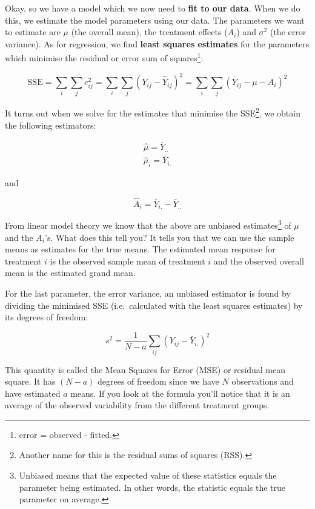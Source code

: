 \documentclass[
  letterpaper,
]{book}
\begin{document}
Okay, so we have a model which we now need to \textbf{fit to our data}.
When we do this, we estimate the model parameters using our data. The
parameters we want to estimate are \(\mu\) (the overall mean), the
treatment effects (\(A_i\)) and \(\sigma^2\) (the error variance). As
for regression, we find \textbf{least squares estimates} for the
parameters which minimise the residual or error sum of
squares\footnote{error = observed - fitted.}:

\[ \text{SSE} = \sum_i\sum_j e_{ij}^2 = \sum_i\sum_j (Y_{ij} - \hat{Y}_{ij})^2 = \sum_i\sum_j (Y_{ij} - \mu - A_i)^2\]

It turns out when we solve for the estimates that minimise the
SSE\footnote{Another name for this is the residual sums of squares
  (RSS).}, we obtain the following estimators:

\[
\begin{aligned}
\hat{\mu} = \bar{Y}_{..} \\
\hat{\mu}_i = \bar{Y}_{i.}
\end{aligned}
\]

and

\[\hat{A}_i =  \bar{Y}_{i.} - \bar{Y}_{..}\]

From linear model theory we know that the above are unbiased
estimates\footnote{Unbiased means that the expected value of these
  statistics equals the parameter being estimated. In other words, the
  statistic equals the true parameter on average.} of \(\mu\) and the
\(A_i\)'s. What does this tell you? It tells you that we can use the
sample means as estimates for the true means. The estimated mean
response for treatment \(i\) is the observed sample mean of treatment
\(i\) and the observed overall mean is the estimated grand mean.

For the last parameter, the error variance, an unbiased estimator is
found by dividing the minimised SSE (i.e.~calculated with the least
squares estimates) by its degrees of freedom:

\[ s^2 = \frac{1}{N-a}\sum_{ij}(Y_{ij} - \bar{Y}_{i.})^2 \]

This quantity is called the Mean Squares for Error (MSE) or residual
mean square. It has \((N-a)\) degrees of freedom since we have \(N\)
observations and have estimated \(a\) means. If you look at the formula
you'll notice that it is an average of the observed variability from the
different treatment groups.
\end{document}
